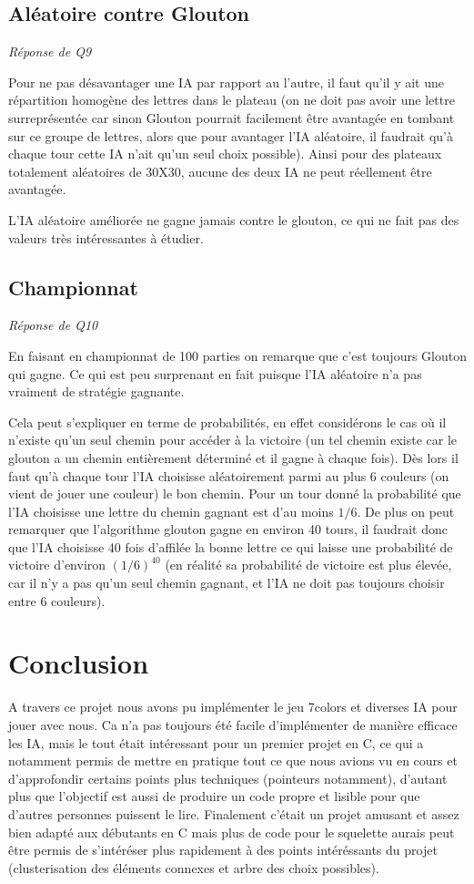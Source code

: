 \documentclass[a4paper,11pt]{article}
\begin{document}
\subsection{Aléatoire contre Glouton}
\emph{Réponse de Q9}

Pour ne pas désavantager une IA par rapport au l'autre, il faut qu'il y ait une répartition homogène des lettres dans le plateau (on ne doit pas avoir une lettre surreprésentée car sinon Glouton pourrait facilement être avantagée en tombant sur ce groupe de lettres, alors que pour avantager l'IA aléatoire, il faudrait qu'à chaque tour cette IA n'ait qu'un seul choix possible). Ainsi pour des plateaux totalement aléatoires de 30X30, aucune des deux IA ne peut réellement être avantagée. 

L'IA aléatoire améliorée ne gagne jamais contre le glouton, ce qui ne fait pas des valeurs très intéressantes à étudier.

\subsection{Championnat}
\emph{Réponse de Q10}

En faisant en championnat de 100 parties on remarque que c'est toujours Glouton qui gagne. Ce qui est peu surprenant en fait puisque l'IA aléatoire n'a pas vraiment de stratégie gagnante. 

Cela peut s'expliquer en terme de probabilités, en effet considérons le cas où il n'existe qu'un seul chemin pour accéder à la victoire (un tel chemin existe car le glouton a un chemin entièrement déterminé et il gagne à chaque fois). Dès lors il faut qu'à chaque tour l'IA choisisse aléatoirement parmi au plus 6 couleurs (on vient de jouer une couleur) le bon chemin. Pour un tour donné la probabilité que l'IA choisisse une lettre du chemin gagnant est d'au moins $1/6$. De plus on peut remarquer que l'algorithme glouton gagne en environ 40 tours, il faudrait donc que l'IA choisisse 40 fois d'affilée la bonne lettre ce qui laisse une probabilité de victoire d'environ $(1/6)^{40}$ (en réalité sa probabilité de victoire est plus élevée, car il n'y a pas qu'un seul chemin gagnant, et l'IA ne doit pas toujours choisir entre 6 couleurs).

\section{Conclusion}

A travers ce projet nous avons pu implémenter le jeu 7colors et diverses IA
pour jouer avec nous. Ca n'a pas toujours été facile d'implémenter de manière
efficace les IA, mais le tout était intéressant pour un premier projet en C, ce qui
a notamment permis de mettre en pratique tout ce que nous avions vu en cours et d'approfondir certains points plus techniques (pointeurs notamment), d'autant plus que l'objectif est aussi de produire un code propre et lisible pour que d'autres personnes puissent le lire. 
Finalement c'était un projet amusant et assez bien adapté aux débutants en C mais plus de code pour le squelette aurais peut être permis de s'intéréser plus rapidement à des points intéréssants du projet (clusterisation des éléments connexes et arbre des choix possibles).
\end{document}
